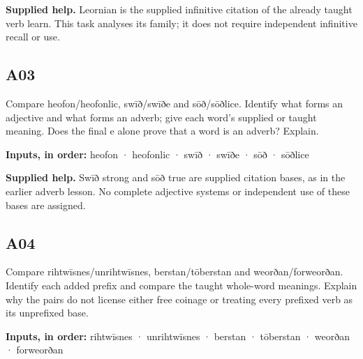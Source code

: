 \textbf{Supplied help.} Leornian is the supplied infinitive citation of the already taught verb learn. This task analyses its family; it does not require independent infinitive recall or use.

\par\begin{minipage}{\linewidth}\raggedright
\subsection*{A03}

Compare heofon/\allowbreak{}heofonlic, swīð/\allowbreak{}swīðe and sōð/\allowbreak{}sōðlice. Identify what forms an adjective and what forms an adverb; give each word’s supplied or taught meaning. Does the final e alone prove that a word is an adverb? Explain.

\textbf{Inputs, in order:} heofon · heofonlic · swīð · swīðe · sōð · sōðlice

\end{minipage}\par\addvspace{4pt}

\textbf{Supplied help.} Swīð strong and sōð true are supplied citation bases, as in the earlier adverb lesson. No complete adjective systems or independent use of these bases are assigned.

\par\begin{minipage}{\linewidth}\raggedright
\subsection*{A04}

Compare rihtwīsnes/\allowbreak{}unrihtwīsnes, berstan/\allowbreak{}tōberstan and weorðan/\allowbreak{}forweorðan. Identify each added prefix and compare the taught whole-word meanings. Explain why the pairs do not license either free coinage or treating every prefixed verb as its unprefixed base.

\textbf{Inputs, in order:} rihtwīsnes · unrihtwīsnes · berstan · tōberstan · weorðan · forweorðan

\end{minipage}\par\addvspace{4pt}

